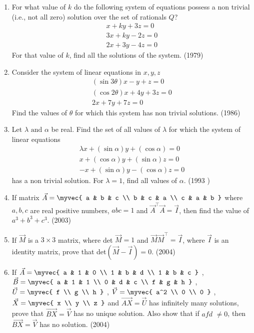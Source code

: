 \begin{enumerate}[label=\thesubsection.\arabic*.,ref=\thesubsection.\theenumi]
\begin{enumerate}
	\end{enumerate}
\item For what value of $k$ do the following system of equations possess a non trivial (i.e., not all zero) solution over the set of rationals ${Q}$?\begin{align*}
x+ky+3z=0\\3x+ky-2z=0\\2x+3y-4z=0\end{align*} For that value of $k$, find all the solutions of the system. \hfill (1979)
\item Consider the system of linear equations in $x, y, z$\begin{align*}(\sin 3\theta) x-y+z=0\\(\cos 2\theta)x+4y+3z=0\\2x+7y+7z=0\end{align*} Find the values of $\theta$ for which this system has non trivial solutions. \hfill (1986)
\item Let $\lambda\text{ and }\alpha$ be real. Find the set of all values of $\lambda$ for which the system of linear equations \begin{align*}\lambda x+(\sin\alpha)y+(\cos\alpha)=0\\ x+(\cos\alpha)y+(\sin\alpha)z=0\\-x+(\sin\alpha)y-(\cos\alpha)z=0\end{align*} has a non trivial solution. For $\lambda = 1$, find all values of $\alpha$. \hfill (1993 )
	\item If matrix 
		$\vec{A} = \myvec{
			a & b & c \\
			b & c & a \\
			c & a & b } $
		where $a,b,c$ are real positive numbers, $abc=1$ and $\vec{A}^\top\vec{A}=\vec{I}$, then find the value of $a^3+b^3+c^3$.
		\hfill(2003)
	\item If $\vec{M}$ is a $3\times3$ matrix, where det $\vec{M}=1$ and $\vec{M}\vec{M}^\top=\vec{I}$, where $\vec{I}$ is an identity matrix, prove that det$(\vec{M}-\vec{I})=0$.
		\hfill(2004)

	\item If $\vec{A} = \myvec{
			a & 1 & 0 \\
			1 & b & d \\
			1 & b & c }$ ,
		$\vec{B} = \myvec{
			a & 1 & 1 \\
			0 & d & c \\
			f & g & h }$ ,
		$\vec{U} = \myvec{
			f \\
			g \\
			h }$ ,
		$\vec{V} = \myvec{
			a^2 \\
			0 \\
			0 }$ ,
		$\vec{X} = \myvec{
			x \\
			y \\
			z }$
		and $\vec{AX}=\vec{U}$ has infinitely many solutions, prove that $\vec{BX}=\vec{V}$ has no unique solution. Also show that if $afd$ $\neq0$, then $\vec{BX}=\vec{V}$ has no solution.
		\hfill(2004)


\end{enumerate}

